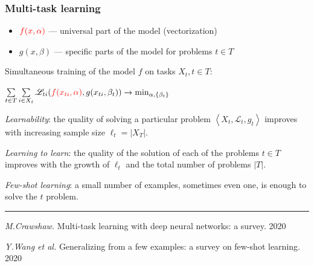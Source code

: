 \documentclass[fullscreen=true, bookmarks=true, hyperref={pdfencoding=unicode}]{beamer}
\begin{document}
\begin{frame}
  \frametitle{Multi-task learning}

  \begin{itemize}
    \item ${\color{red}f(x,\alpha)}$ — universal part of the model (vectorization)
    \item $g(x, \beta)$ — specific parts of the model for problems $t \in T$
  \end{itemize}

  Simultaneous training of the model $f$ on tasks $X_t, t \in T$:

  \begin{center}
    $\sum\limits_{t \in T} \sum\limits_{i \in X_t} \mathscr{L}_{ti} ({\color{red}f(x_{ti},\alpha)}, g (x_{ti}, \beta_t)) \to \min_{\alpha, \{\beta_t\}}$
  \end{center}

  \pause
  \vspace{0.2cm}
  {\it Learnability}: the quality of solving a particular problem $\left< X_t, \mathscr{L}_t, g_t\right>$
  improves with increasing sample size $\ell_t = |X_T|$.

  \pause
  \vspace{0.2cm}
  {\it Learning to learn}: the quality of the solution of each of the problems $t \in T$ improves with the growth of $\ell_t$ and the total number of problems $|T|$.

  \pause
  \vspace{0.2cm}
  {\it Few-shot learning}: a small number of examples, sometimes even one, is enough to solve the $t$ problem.

  \noindent\rule{8cm}{0.4pt}

  {\footnotesize
  {\it M.Crawshaw.} Multi-task learning with deep neural networks: a survey. 2020

  {\it Y.Wang et al.} Generalizing from a few examples: a survey on few-shot learning. 2020}
\end{frame}


\end{document}
